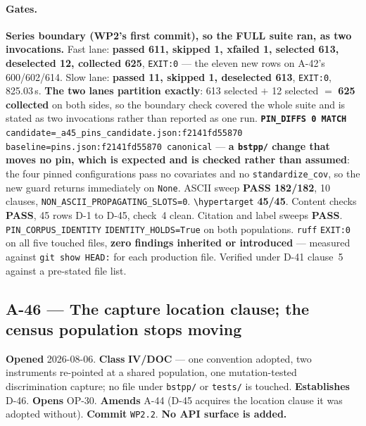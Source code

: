 \documentclass[
  10pt,
]{article}
\begin{document}
\paragraph{Gates.}
\textbf{Series boundary (WP2's first commit), so the FULL suite ran, as two invocations.} Fast lane: \textbf{passed 611, skipped 1, xfailed 1, selected 613, deselected 12, collected 625}, \texttt{EXIT:0} --- the eleven new rows on A-42's 600/602/614. Slow lane: \textbf{passed 11, skipped 1, deselected 613}, \texttt{EXIT:0}, 825.03\,s. \textbf{The two lanes partition exactly}: 613 selected $+$ 12 selected $=$ \textbf{625 collected} on both sides, so the boundary check covered the whole suite and is stated as two invocations rather than reported as one run. \textbf{\texttt{PIN\_DIFFS 0 MATCH}} \texttt{candidate=\allowbreak{}\_a45\_pins\_candidate.json:\allowbreak{}f2141fd55870 baseline=\allowbreak{}pins.json:\allowbreak{}f2141fd55870 canonical} --- \textbf{a \texttt{bstpp/} change that moves no pin, which is expected and is checked rather than assumed}: the four pinned configurations pass no covariates and no \texttt{standardize\_cov}, so the new guard returns immediately on \texttt{None}. ASCII sweep \textbf{PASS 182/182}, 10 clauses, \texttt{NON\_ASCII\_PROPAGATING\_SLOTS=0}. \texttt{\textbackslash hypertarget} \textbf{45/45}. Content checks \textbf{PASS}, 45 rows D-1 to D-45, check~4 clean. Citation and label sweeps \textbf{PASS}. \texttt{PIN\_CORPUS\_IDENTITY} \texttt{IDENTITY\_HOLDS=True} on both populations. \texttt{ruff} \texttt{EXIT:0} on all five touched files, \textbf{zero findings inherited or introduced} --- measured against \texttt{git show HEAD:} for each production file. Verified under D-41 clause~5 against a pre-stated file list.

\hypertarget{a-46}{%
\subsection{A-46 --- The capture location clause; the census population stops moving}\label{a-46}}

\textbf{Opened} 2026-08-06. \textbf{Class} \textbf{IV/DOC} --- one convention adopted, two instruments re-pointed at a shared population, one mutation-tested discrimination capture; no file under \texttt{bstpp/} or \texttt{tests/} is touched. \textbf{Establishes} D-46. \textbf{Opens} OP-30. \textbf{Amends} A-44 (D-45 acquires the location clause it was adopted without). \textbf{Commit} \texttt{WP2.2}. \textbf{No API surface is added.}
\end{document}
